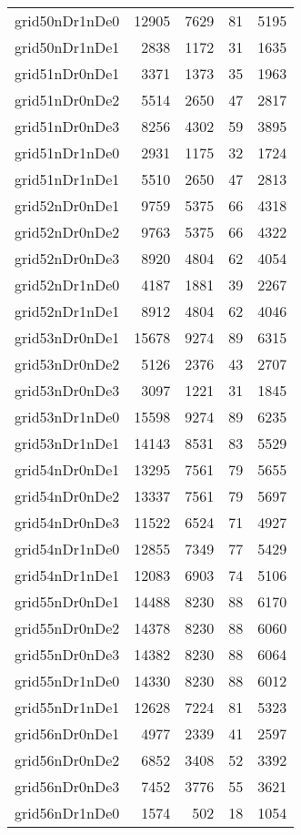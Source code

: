 \documentclass[../../../thesis.tex]{subfiles}
\begin{document}
\begin{longtable}{lrrrr}
grid50nDr1nDe0 & 12905 & 7629 & 81 & 5195 \\
grid50nDr1nDe1 & 2838 & 1172 & 31 & 1635 \\
grid51nDr0nDe1 & 3371 & 1373 & 35 & 1963 \\
grid51nDr0nDe2 & 5514 & 2650 & 47 & 2817 \\
grid51nDr0nDe3 & 8256 & 4302 & 59 & 3895 \\
grid51nDr1nDe0 & 2931 & 1175 & 32 & 1724 \\
grid51nDr1nDe1 & 5510 & 2650 & 47 & 2813 \\
grid52nDr0nDe1 & 9759 & 5375 & 66 & 4318 \\
grid52nDr0nDe2 & 9763 & 5375 & 66 & 4322 \\
grid52nDr0nDe3 & 8920 & 4804 & 62 & 4054 \\
grid52nDr1nDe0 & 4187 & 1881 & 39 & 2267 \\
grid52nDr1nDe1 & 8912 & 4804 & 62 & 4046 \\
grid53nDr0nDe1 & 15678 & 9274 & 89 & 6315 \\
grid53nDr0nDe2 & 5126 & 2376 & 43 & 2707 \\
grid53nDr0nDe3 & 3097 & 1221 & 31 & 1845 \\
grid53nDr1nDe0 & 15598 & 9274 & 89 & 6235 \\
grid53nDr1nDe1 & 14143 & 8531 & 83 & 5529 \\
grid54nDr0nDe1 & 13295 & 7561 & 79 & 5655 \\
grid54nDr0nDe2 & 13337 & 7561 & 79 & 5697 \\
grid54nDr0nDe3 & 11522 & 6524 & 71 & 4927 \\
grid54nDr1nDe0 & 12855 & 7349 & 77 & 5429 \\
grid54nDr1nDe1 & 12083 & 6903 & 74 & 5106 \\
grid55nDr0nDe1 & 14488 & 8230 & 88 & 6170 \\
grid55nDr0nDe2 & 14378 & 8230 & 88 & 6060 \\
grid55nDr0nDe3 & 14382 & 8230 & 88 & 6064 \\
grid55nDr1nDe0 & 14330 & 8230 & 88 & 6012 \\
grid55nDr1nDe1 & 12628 & 7224 & 81 & 5323 \\
grid56nDr0nDe1 & 4977 & 2339 & 41 & 2597 \\
grid56nDr0nDe2 & 6852 & 3408 & 52 & 3392 \\
grid56nDr0nDe3 & 7452 & 3776 & 55 & 3621 \\
grid56nDr1nDe0 & 1574 & 502 & 18 & 1054 \\

\end{longtable}
\end{document}
